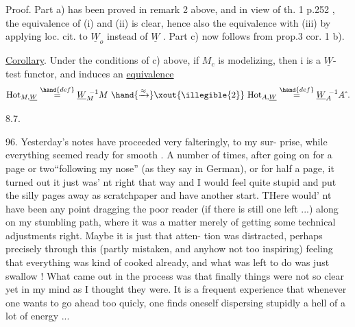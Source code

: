 
Proof. Part a) has been proved in remark 2 above, and in view of
th. 1  p.252 , the equivalence of (i) and (ii) is clear,
hence also the equivalence with (iii) by applying loc. cit. to $\underline{W}_o$
instead of $\underline{W}$ . Part c) now follows from prop.3 cor. 1 b).

\uline{Corollary}. Under the conditions of c) above, if $M_c$ is modelizing,
then i is a $\underline{W}$-test functor, and induces an \uline{equivalence}
\[ \mathrm{Hot}_{M,\underline{W}} \overset{\hand{def}}{=} \underline{W}_M^{\ -1} M \ \hand{\xrightarrow{\approx}}\xout{\illegible{2}}\ \mathrm{Hot}_{A,\underline{W}} \overset{\hand{def}}{=} \underline{W}_A^{\ -1}A\hat{\ } . \]

8.7.

96. Yesterday's notes have proceeded very falteringly, to my sur-%
prise, while everything seemed ready for smooth . A number
of times, after going on for a page or two``following my nose'' (as
they say in German), or for half a page, it turned out it just was'%
nt right that way and I would  feel quite stupid and put the silly
pages away as scratchpaper and  have another start. THere would'%
nt have been any point dragging the poor reader (if there is still one
left ...) along on my stumbling path, where it was a matter merely of
getting some technical adjustments right. Maybe it is just that atten-%
tion was distracted, perhaps precisely through this (partly mistaken,
and anyhow not too inspiring) feeling that everything was kind of
cooked already, and what was left to do was just swallow ! What came
out in the process was that finally things were not so clear yet in my
mind as I  thought they were. It is a frequent experience
that whenever one wants to go ahead too quicly, one finds oneself
dispersing stupidly a hell of a lot of energy ...

